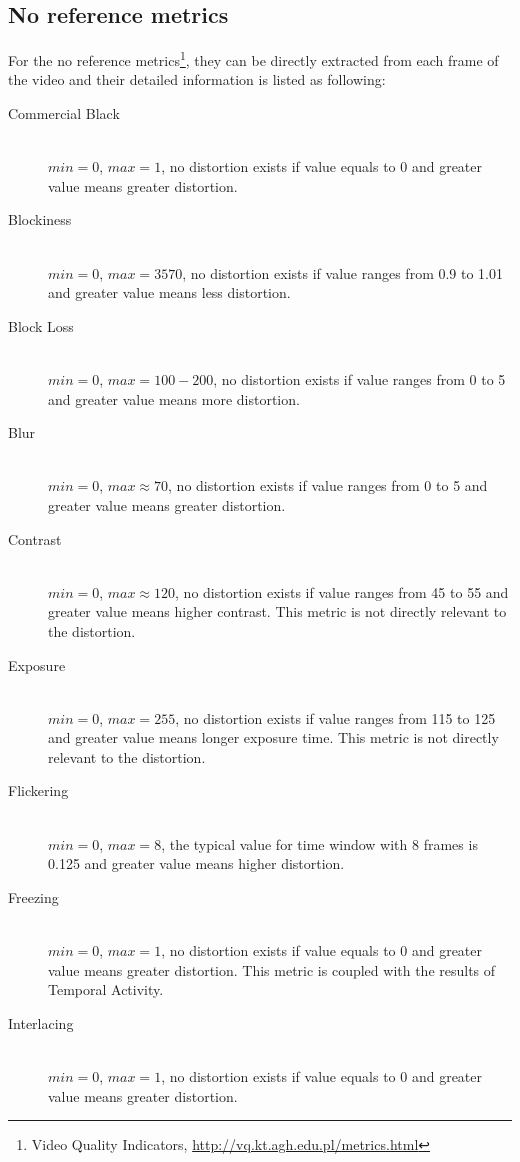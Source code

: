 \documentclass[10pt,conference,compsocconf]{IEEEtran}
\begin{document}
\subsection{No reference metrics}
\label{nr_metrics}
For the no reference metrics\footnote{Video Quality Indicators, \url{http://vq.kt.agh.edu.pl/metrics.html}}, they can be directly extracted from each frame of the video and their detailed information is listed as following:
\begin{description}
\item[Commercial Black] \ \\
  $min = 0$, $max = 1$, no distortion exists if value equals to 0 and greater value means greater distortion.
\item[Blockiness] \ \\
  $min = 0$, $max = 3570$, no distortion exists if value ranges from 0.9 to 1.01 and greater value means less distortion.
\item[Block Loss] \ \\
  $min = 0$, $max = 100 - 200$, no distortion exists if value ranges from 0 to 5 and greater value means more distortion.
\item[Blur] \ \\
  $min = 0$, $max \approx 70$, no distortion exists if value ranges from 0 to 5 and greater value means greater distortion.
\item[Contrast] \ \\
  $min = 0$, $max \approx 120$, no distortion exists if value ranges from 45 to 55 and greater value means higher contrast. This metric is not directly relevant to the distortion.
\item[Exposure] \ \\
  $min = 0$, $max = 255$, no distortion exists if value ranges from 115 to 125 and greater value means longer exposure time. This metric is not directly relevant to the distortion.
\item[Flickering] \ \\
  $min = 0$, $max = 8$, the typical value for time window with 8 frames is 0.125 and greater value means higher distortion.
\item[Freezing] \ \\
  $min = 0$, $max = 1$, no distortion exists if value equals to 0 and greater value means greater distortion. This metric is coupled with the results of Temporal Activity.
\item[Interlacing] \ \\
  $min = 0$, $max = 1$, no distortion exists if value equals to 0 and greater value means greater distortion.

\end{description}
\end{document}
